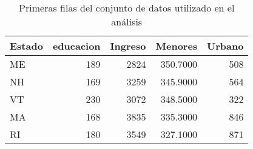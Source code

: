 \begin{table}
\caption{Primeras filas del conjunto de datos utilizado en el análisis}
\label{tab:head_datos}
\begin{tabular}{lrrrr}
\toprule
Estado & educacion & Ingreso & Menores & Urbano \\
\midrule
ME & 189 & 2824 & 350.7000 & 508 \\
NH & 169 & 3259 & 345.9000 & 564 \\
VT & 230 & 3072 & 348.5000 & 322 \\
MA & 168 & 3835 & 335.3000 & 846 \\
RI & 180 & 3549 & 327.1000 & 871 \\
\bottomrule
\end{tabular}
\end{table}
